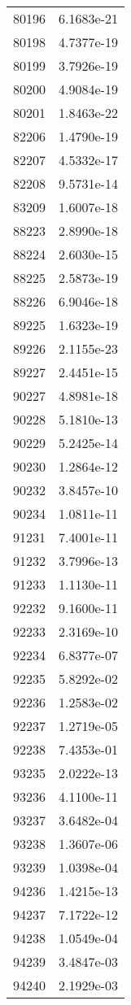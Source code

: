\begin{table}[h!]
\begin{tabular}{|| c || c |}
80196 & 6.1683e-21 \\
80198 & 4.7377e-19 \\
80199 & 3.7926e-19 \\
80200 & 4.9084e-19 \\
80201 & 1.8463e-22 \\
82206 & 1.4790e-19 \\
82207 & 4.5332e-17 \\
82208 & 9.5731e-14 \\
83209 & 1.6007e-18 \\
88223 & 2.8990e-18 \\
88224 & 2.6030e-15 \\
88225 & 2.5873e-19 \\
88226 & 6.9046e-18 \\
89225 & 1.6323e-19 \\
89226 & 2.1155e-23 \\
89227 & 2.4451e-15 \\
90227 & 4.8981e-18 \\
90228 & 5.1810e-13 \\
90229 & 5.2425e-14 \\
90230 & 1.2864e-12 \\
90232 & 3.8457e-10 \\
90234 & 1.0811e-11 \\
91231 & 7.4001e-11 \\
91232 & 3.7996e-13 \\
91233 & 1.1130e-11 \\
92232 & 9.1600e-11 \\
92233 & 2.3169e-10 \\
92234 & 6.8377e-07 \\
92235 & 5.8292e-02 \\
92236 & 1.2583e-02 \\
92237 & 1.2719e-05 \\
92238 & 7.4353e-01 \\
93235 & 2.0222e-13 \\
93236 & 4.1100e-11 \\
93237 & 3.6482e-04 \\
93238 & 1.3607e-06 \\
93239 & 1.0398e-04 \\
94236 & 1.4215e-13 \\
94237 & 7.1722e-12 \\
94238 & 1.0549e-04 \\
94239 & 3.4847e-03 \\
94240 & 2.1929e-03 \\

\end{tabular}
\end{table}
